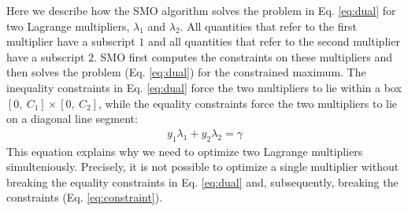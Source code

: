 Here we describe how the SMO algorithm \cite{Platt1999} solves the problem in Eq. \ref{eq:dual} for two Lagrange multipliers, $\lambda_1$ and $\lambda_2$. 
All quantities that refer to the first multiplier have a subscript $1$ and all quantities that refer to the second multiplier have a subscript $2$. 
SMO first computes the constraints on these multipliers and then solves the problem (Eq. \ref{eq:dual}) for the constrained maximum. 
The inequality constraints in Eq. \ref{eq:dual} force the two multipliers to lie within a box $[0,~C_1]\times[0,~C_2]$, while the equality constraints 
force the two multipliers to lie on a diagonal line segment:
%
  \begin{eqnarray}
y_1 \lambda_1 + y_2 \lambda_2 = %
\gamma
\label{eq:constraint}
 \end{eqnarray}
 This equation explains why we need to optimize two Lagrange multipliers simulteniously. %
Precisely, it is not possible to optimize a single multiplier without breaking the equality constraints in Eq. \ref{eq:dual} and, subsequently, breaking the constraints (Eq. \ref{eq:constraint}).

